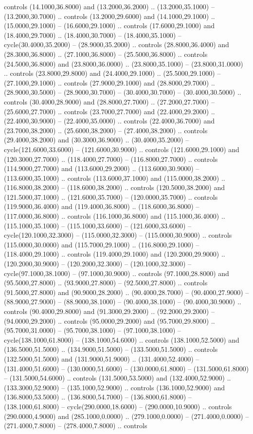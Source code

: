 controls (14.1000,36.8000) and (13.2000,36.2000) .. (13.2000,35.1000) -- (13.2000,30.7000) .. controls (13.2000,29.6000) and (14.1000,29.1000) .. (15.0000,29.1000) -- (16.6000,29.1000) .. controls (17.6000,29.1000) and (18.4000,29.7000) .. (18.4000,30.7000) -- (18.4000,35.1000) -- cycle(30.4000,35.2000) -- (28.9000,35.2000) .. controls (28.8000,36.4000) and (28.3000,36.8000) .. (27.1000,36.8000) -- (25.5000,36.8000) .. controls (24.5000,36.8000) and (23.8000,36.0000) .. (23.8000,35.1000) -- (23.8000,31.0000) .. controls (23.8000,29.8000) and (24.4000,29.1000) .. (25.5000,29.1000) -- (27.1000,29.1000) .. controls (27.9000,29.1000) and (28.8000,29.7000) .. (28.9000,30.5000) -- (28.9000,30.7000) -- (30.4000,30.7000) -- (30.4000,30.5000) .. controls (30.4000,28.9000) and (28.8000,27.7000) .. (27.2000,27.7000) -- (25.6000,27.7000) .. controls (23.7000,27.7000) and (22.4000,29.2000) .. (22.4000,30.9000) -- (22.4000,35.0000) .. controls (22.4000,36.7000) and (23.7000,38.2000) .. (25.6000,38.2000) -- (27.4000,38.2000) .. controls (29.4000,38.2000) and (30.3000,36.9000) .. (30.4000,35.2000) -- cycle(121.6000,33.6000) -- (121.6000,30.9000) .. controls (121.6000,29.1000) and (120.3000,27.7000) .. (118.4000,27.7000) -- (116.8000,27.7000) .. controls (114.9000,27.7000) and (113.6000,29.2000) .. (113.6000,30.9000) -- (113.6000,35.1000) .. controls (113.6000,37.1000) and (115.0000,38.2000) .. (116.8000,38.2000) -- (118.6000,38.2000) .. controls (120.5000,38.2000) and (121.5000,37.1000) .. (121.6000,35.7000) -- (120.0000,35.7000) .. controls (119.9000,36.4000) and (119.4000,36.8000) .. (118.6000,36.8000) -- (117.0000,36.8000) .. controls (116.1000,36.8000) and (115.1000,36.4000) .. (115.1000,35.1000) -- (115.1000,33.6000) -- (121.6000,33.6000) -- cycle(120.1000,32.3000) -- (115.0000,32.3000) -- (115.0000,30.9000) .. controls (115.0000,30.0000) and (115.7000,29.1000) .. (116.8000,29.1000) -- (118.4000,29.1000) .. controls (119.4000,29.1000) and (120.2000,29.9000) .. (120.2000,30.9000) -- (120.2000,32.3000) -- (120.1000,32.3000) -- cycle(97.1000,38.1000) -- (97.1000,30.9000) .. controls (97.1000,28.8000) and (95.5000,27.8000) .. (93.9000,27.8000) -- (92.5000,27.8000) .. controls (91.5000,27.8000) and (90.9000,28.2000) .. (90.4000,28.7000) -- (90.4000,27.9000) -- (88.9000,27.9000) -- (88.9000,38.1000) -- (90.4000,38.1000) -- (90.4000,30.9000) .. controls (90.4000,29.8000) and (91.3000,29.2000) .. (92.2000,29.2000) -- (94.0000,29.2000) .. controls (95.0000,29.2000) and (95.7000,29.8000) .. (95.7000,31.0000) -- (95.7000,38.1000) -- (97.1000,38.1000) -- cycle(138.1000,61.8000) -- (138.1000,54.6000) .. controls (138.1000,52.5000) and (136.5000,51.5000) .. (134.9000,51.5000) -- (133.5000,51.5000) .. controls (132.5000,51.5000) and (131.9000,51.9000) .. (131.4000,52.4000) -- (131.4000,51.6000) -- (130.0000,51.6000) -- (130.0000,61.8000) -- (131.5000,61.8000) -- (131.5000,54.6000) .. controls (131.5000,53.5000) and (132.4000,52.9000) .. (133.3000,52.9000) -- (135.1000,52.9000) .. controls (136.1000,52.9000) and (136.8000,53.5000) .. (136.8000,54.7000) -- (136.8000,61.8000) -- (138.1000,61.8000) -- cycle(290.0000,18.6000) -- (290.0000,10.9000) .. controls (290.0000,4.9000) and (285.1000,0.0000) .. (279.1000,0.0000) -- (271.4000,0.0000) -- (271.4000,7.8000) -- (278.4000,7.8000) .. controls 